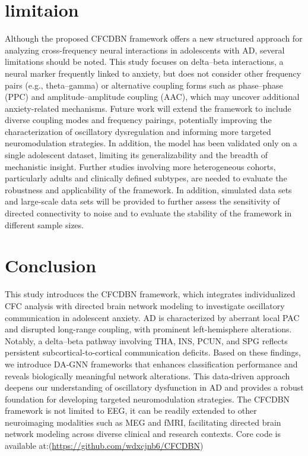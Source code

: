 \documentclass[lettersize,journal]{IEEEtran}
\begin{document}
\section{limitaion}
Although the proposed CFCDBN framework offers a new structured approach for analyzing cross-frequency neural interactions in adolescents with AD, several limitations should be noted. This study focuses on delta–beta interactions, a neural marker frequently linked to anxiety, but does not consider other frequency pairs (e.g., theta–gamma) or alternative coupling forms such as phase–phase (PPC) and amplitude–amplitude coupling (AAC), which may uncover additional anxiety-related mechanisms. Future work will extend the framework to include diverse coupling modes and frequency pairings, potentially improving the characterization of oscillatory dysregulation and informing more targeted neuromodulation strategies.
In addition, the model has been validated only on a single adolescent dataset, limiting its generalizability and the breadth of mechanistic insight. Further studies involving more heterogeneous cohorts, particularly adults and clinically defined subtypes, are needed to evaluate the robustness and applicability of the framework. In addition, simulated data sets and large-scale data sets will be provided to further assess the sensitivity of directed connectivity to noise and to evaluate the stability of the framework in different sample sizes.
\section{Conclusion}
This study introduces the CFCDBN framework, which integrates individualized CFC analysis with directed brain network modeling to investigate oscillatory communication in adolescent anxiety. AD is characterized by aberrant local PAC and disrupted long-range coupling, with prominent left-hemisphere alterations. Notably, a delta–beta pathway involving THA, INS, PCUN, and SPG reflects persistent subcortical-to-cortical communication deficits. Based on these findings, we introduce DA-GNN frameworks that enhances classification performance and reveals biologically meaningful network alterations. This data-driven approach deepens our understanding of oscillatory dysfunction in AD and provides a robust foundation for developing targeted neuromodulation strategies. 
The CFCDBN framework is not limited to EEG, it can be readily extended to other neuroimaging modalities such as MEG and fMRI, facilitating directed brain network modeling across diverse clinical and research contexts. Core code is available at:(\url{https://github.com/wdxcjnb6/CFCDBN})
\end{document}
